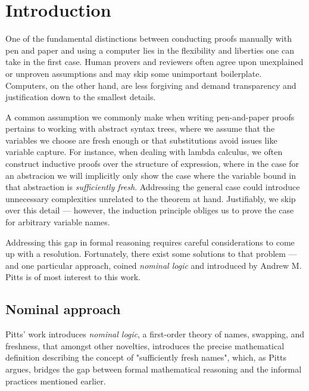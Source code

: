 \documentclass[english, mgr]{iithesis}
\author         {Dominik Gulczyński}
\date           {\today}                     %
\renewcommand{\it}[1]{\textit{#1}}
\begin{document}
\chapter{Introduction}
One of the fundamental distinctions between conducting proofs manually with pen and paper
and using a computer lies in the flexibility and liberties one can take in the first case.
Human provers and reviewers often agree upon unexplained or unproven assumptions
and may skip some unimportant boilerplate.
Computers, on the other hand, are less forgiving
and demand transparency and justification down to the smallest details.

A common assumption we commonly make when writing pen-and-paper proofs pertains to
working with abstract syntax trees,
where we assume that the variables we choose are fresh enough
or that substitutions avoid issues like variable capture.
For instance, when dealing with lambda calculus, we often construct inductive proofs
over the structure of expression, where in the case for an abstracion we will implicitly only show
the case where the variable bound in that abstraction is \it{sufficiently fresh}.
Addressing the general case could introduce unnecessary complexities unrelated to the theorem at hand.
Justifiably, we skip over this detail --- however, the induction principle obliges us to prove the case for arbitrary variable names.

Addressing this gap in formal reasoning requires careful considerations to come up with a resolution.
Fortunately, there exist some solutions to that problem --- and one particular
approach, coined \it{nominal logic} and introduced by Andrew M. Pitts\cite{nominal-logic} is of most interest to this work.

\section{Nominal approach}
Pitts' work introduces \it{nominal logic}, a first-order theory of names, swapping, and freshness,
that amongst other novelties, introduces the precise mathematical definition
describing the concept of "sufficiently fresh names",
which, as Pitts argues, bridges the gap between formal mathematical reasoning and the informal practices mentioned earlier.
\end{document}
